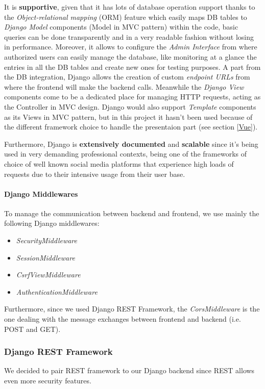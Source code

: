 \documentclass[table, 12pt]{article}
\begin{document}
It is \textbf{supportive}, given that it has lots of database operation support thanks to the \emph{Object-relational mapping} (ORM) feature which easily maps DB tables to \emph{Django Model} components (Model in MVC pattern) within the code, basic queries can be done transparently and in a very readable fashion without losing in performance.
Moreover, it allows to configure the \emph{Admin Interface} from where authorized users can easily manage the database, like monitoring at a glance the entries in all the DB tables and create new ones for testing purposes. A part from the DB integration,  Django allows the creation of custom \emph{endpoint URLs} from where the frontend will make the backend calls. Meanwhile the \emph{Django View} components come to be a dedicated place for managing HTTP requests, acting as the Controller in MVC design. Django would also support \emph{Template} components as its Views in MVC pattern, but in this project it hasn't been used because of the different framework choice to handle the presentaion part (see section \ref{Vue}).

Furthermore, Django is \textbf{extensively documented} and \textbf{scalable} since it's being used in very demanding professional contexts, being one of the frameworks of choice of well known social media platforms that experience high loads of requests due to their intensive usage from their user base.

\paragraph{Django Middlewares}
To manage the communication between backend and frontend, we use mainly the following Django middlewares:
\begin{itemize}
    \item \textit{SecurityMiddleware}
    \item \textit{SessionMiddleware}
    \item \textit{CsrfViewMiddleware}
    \item \textit{AuthenticationMiddleware}
\end{itemize}

Furthermore, since we used Django REST Framework, the \textit{CorsMiddleware} is the one dealing with the message exchanges between frontend and backend (i.e. POST and GET).

\subsubsection{Django REST Framework}
\label{REST}
We decided to pair REST framework to our Django backend since REST allows even more security features.
\end{document}
